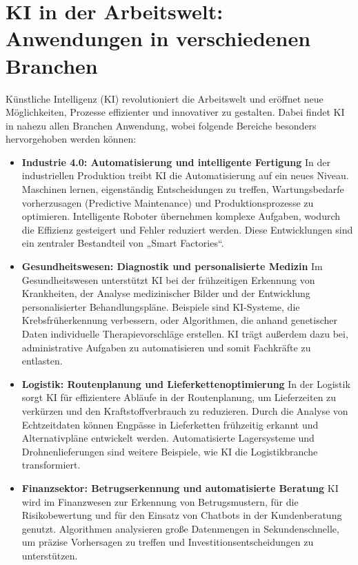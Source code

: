 \documentclass[a4paper,12pt]{article}
\begin{document}

\section{KI in der Arbeitswelt: Anwendungen in verschiedenen Branchen}

Künstliche Intelligenz (KI) revolutioniert die Arbeitswelt und eröffnet neue Möglichkeiten, Prozesse effizienter und innovativer zu gestalten. Dabei findet KI in nahezu allen Branchen Anwendung, wobei folgende Bereiche besonders hervorgehoben werden können:

\begin{itemize} \item \textbf{Industrie 4.0: Automatisierung und intelligente Fertigung}
In der industriellen Produktion treibt KI die Automatisierung auf ein neues Niveau. Maschinen lernen, eigenständig Entscheidungen zu treffen, Wartungsbedarfe vorherzusagen (Predictive Maintenance) und Produktionsprozesse zu optimieren. Intelligente Roboter übernehmen komplexe Aufgaben, wodurch die Effizienz gesteigert und Fehler reduziert werden. Diese Entwicklungen sind ein zentraler Bestandteil von „Smart Factories“.

\item \textbf{Gesundheitswesen: Diagnostik und personalisierte Medizin}  
Im Gesundheitswesen unterstützt KI bei der frühzeitigen Erkennung von Krankheiten, der Analyse medizinischer Bilder und der Entwicklung personalisierter Behandlungspläne. Beispiele sind KI-Systeme, die Krebsfrüherkennung verbessern, oder Algorithmen, die anhand genetischer Daten individuelle Therapievorschläge erstellen. KI trägt außerdem dazu bei, administrative Aufgaben zu automatisieren und somit Fachkräfte zu entlasten.

\item \textbf{Logistik: Routenplanung und Lieferkettenoptimierung}  
In der Logistik sorgt KI für effizientere Abläufe in der Routenplanung, um Lieferzeiten zu verkürzen und den Kraftstoffverbrauch zu reduzieren. Durch die Analyse von Echtzeitdaten können Engpässe in Lieferketten frühzeitig erkannt und Alternativpläne entwickelt werden. Automatisierte Lagersysteme und Drohnenlieferungen sind weitere Beispiele, wie KI die Logistikbranche transformiert.

\item \textbf{Finanzsektor: Betrugserkennung und automatisierte Beratung}  
KI wird im Finanzwesen zur Erkennung von Betrugsmustern, für die Risikobewertung und für den Einsatz von Chatbots in der Kundenberatung genutzt. Algorithmen analysieren große Datenmengen in Sekundenschnelle, um präzise Vorhersagen zu treffen und Investitionsentscheidungen zu unterstützen.


\end{itemize}
\end{document}
